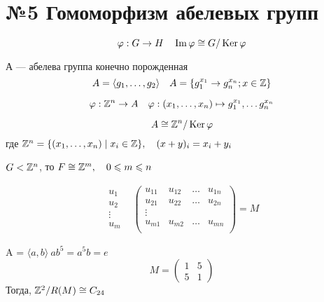 \section{№5 Гомоморфизм абелевых групп}

\begin{reminder}
  \[\varphi : G \rightarrow H \quad \operatorname{Im} \varphi \cong G / \operatorname{Ker} \varphi\]
\end{reminder}

\begin{example}
  А --- абелева группа конечно порожденная
  \[A = \langle g_1, \dots , g_2 \rangle \quad A = \{g_1^{x_1} \rightarrow g_n^{x_n}; x \in \mathbb{Z}\}\]
\end{example}

\begin{proposition}
  \[\varphi : \mathbb{Z}^n \rightarrow A \quad \varphi: (x_1, \dots, x_n) \mapsto g_1^{x_1}, \dots g_n^{x_n}\]
\end{proposition}

\begin{theorem}
  \[A \cong \mathbb{Z}^n / \operatorname{Ker} \varphi\]
  где $\mathbb{Z}^n = \{(x_1, \dots, x_n) \mid x_i \in \mathbb{Z}\}, \quad (x + y)_i = x_i + y_i$
\end{theorem}

\begin{theorem}
  $G < \mathbb{Z}^n$, то $F \cong \mathbb{Z}^m, \quad 0 \leqslant m \leqslant n$
\end{theorem}

\begin{example}
  \[
  \begin{matrix}

  \begin{matrix}
    u_1 \\
    u_2 \\
    \vdots \\
    u_m
  \end{matrix}
  &
  \begin{pmatrix}
    u_{11} & u_{12} & \dots & u_{1n} \\
    u_{21} & u_{22} & \dots & u_{2n} \\
    \vdots \\
    u_{m1} & u_{m2} & \dots & u_{mn} \\
  \end{pmatrix}
  = M
  \end{matrix}
  \]
\end{example}

\begin{example}
  A = $\langle a, b \rangle \  ab^5 = a^5 b = e$
  \[M = 
  \begin{pmatrix}
    1 & 5 \\
    5 & 1
  \end{pmatrix}
  \]
  Тогда, $\mathbb{Z}^2 / R(M) \cong C_{24}$
\end{example}

